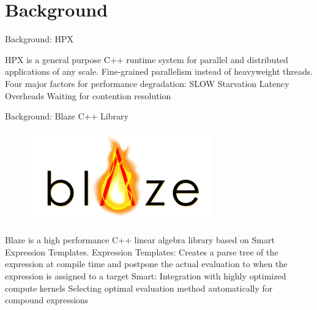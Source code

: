 \documentclass[10pt]{beamer}
\begin{document}
\section{Background}
\begin{frame}{Background: HPX}
	\begin{outline}
		\1HPX is a general purpose C++ runtime system for parallel and distributed applications of any scale.
		\1Fine-grained parallelism instead of heavyweight threads.
		\1Four major factors for performance degradation: SLOW
		\2Starvation
		\2Latency
		\2Overheads
		\2Waiting for contention resolution
	\end{outline}
\end{frame}



\begin{frame}{Background: Blaze C++ Library}
\begin{outline}
\begin{figure}[H]

	\includegraphics[width=0.22\linewidth]{images/blaze.png}
\end{figure}	
Blaze is a high performance C++ linear algebra library based on Smart Expression Templates.
 \1Expression Templates:
	\2Creates a parse tree of the expression at compile time and postpone the actual evaluation to when the expression is assigned to a target
\1Smart: 
	\2Integration with highly optimized compute kernels
	\2Selecting optimal evaluation method automatically for compound expressions
\end{outline}
\end{frame}
\end{document}
